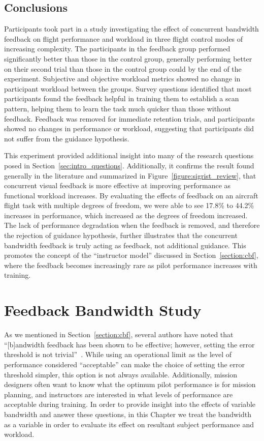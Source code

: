 \section{Conclusions}
Participants took part in a study investigating the effect of concurrent bandwidth feedback on flight performance and workload in three flight control modes of increasing complexity.
The participants in the feedback group performed significantly better than those in the control group, generally performing better on their second trial than those in the control group could by the end of the experiment.
Subjective and objective workload metrics showed no change in participant workload between the groups.
Survey questions identified that most participants found the feedback helpful in training them to establish a scan pattern, helping them to learn the task much quicker than those without feedback.
Feedback was removed for immediate retention trials, and participants showed no changes in performance or workload, suggesting that participants did not suffer from the guidance hypothesis.

This experiment provided additional insight into many of the research questions posed in Section~\ref{sec:intro_questions}.
Additionally, it confirms the result found generally in the literature and summarized in Figure~\ref{figure:sigrist_review}, that concurrent visual feedback is more effective at improving performance as functional workload increases.
By evaluating the effects of feedback on an aircraft flight task with multiple degrees of freedom, we were able to see 17.8\% to 44.2\% increases in performance, which increased as the degrees of freedom increased.
The lack of performance degradation when the feedback is removed, and therefore the rejection of guidance hypothesis, further illustrates that the concurrent bandwidth feedback is truly acting as feedback, not additional guidance.
This promotes the concept of the ``instructor model'' discussed in Section~\ref{section:cbf}, where the feedback becomes increasingly rare as pilot performance increases with training.

\chapter{Feedback Bandwidth Study}
\label{chapter:bandwidthstudy}

As we mentioned in Section~\ref{section:cbf}, several authors have noted that ``[b]andwidth feedback has been shown to be effective; however, setting the error threshold is not trivial''~\citep{timmermans_technology-assisted_2009, RIBEIRO2011231, sigrist_augmented_2013}.
While using an operational limit as the level of performance considered ``acceptable'' can make the choice of setting the error threshold simpler, this option is not always available.
Additionally, mission designers often want to know what the optimum pilot performance is for mission planning, and instructors are interested in what levels of performance are acceptable during training.
In order to provide insight into the effects of variable bandwidth and answer these questions, in this Chapter we treat the bandwidth as a variable in order to evaluate its effect on resultant subject performance and workload.

